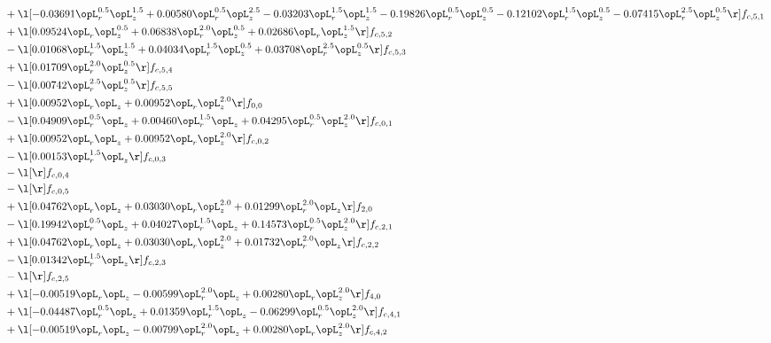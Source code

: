 \begin{alignat}{2}
& + \l[  -0.03691 \opL_r^{0.5} \opL_z^{1.5} +  0.00580 \opL_r^{0.5} \opL_z^{2.5}   -0.03203 \opL_r^{1.5} \opL_z^{1.5}   -0.19826 \opL_r^{0.5} \opL_z^{0.5}   -0.12102 \opL_r^{1.5} \opL_z^{0.5}   -0.07415 \opL_r^{2.5} \opL_z^{0.5}  \r] f_{c,5,1} \nonumber \\ 
& + \l[  0.09524 \opL_r \opL_z^{0.5} +  0.06838 \opL_r^{2.0} \opL_z^{0.5} +  0.02686 \opL_r \opL_z^{1.5}  \r] f_{c,5,2} \nonumber \\ 
& - \l[  0.01068 \opL_r^{1.5} \opL_z^{1.5} +  0.04034 \opL_r^{1.5} \opL_z^{0.5} +  0.03708 \opL_r^{2.5} \opL_z^{0.5}  \r] f_{c,5,3} \nonumber \\ 
& + \l[  0.01709 \opL_r^{2.0} \opL_z^{0.5}  \r] f_{c,5,4} \nonumber \\ 
& - \l[  0.00742 \opL_r^{2.5} \opL_z^{0.5}  \r] f_{c,5,5} \nonumber \\ 
& + \l[  0.00952 \opL_r \opL_z +  0.00952 \opL_r \opL_z^{2.0}  \r] f_{0,0} \nonumber \\ 
& - \l[  0.04909 \opL_r^{0.5} \opL_z +  0.00460 \opL_r^{1.5} \opL_z +  0.04295 \opL_r^{0.5} \opL_z^{2.0}  \r] f_{c,0,1} \nonumber \\ 
& + \l[  0.00952 \opL_r \opL_z +  0.00952 \opL_r \opL_z^{2.0}  \r] f_{c,0,2} \nonumber \\ 
& - \l[  0.00153 \opL_r^{1.5} \opL_z  \r] f_{c,0,3} \nonumber \\ 
& - \l[  \r] f_{c,0,4} \nonumber \\ 
& - \l[  \r] f_{c,0,5} \nonumber \\ 
& + \l[  0.04762 \opL_r \opL_z +  0.03030 \opL_r \opL_z^{2.0} +  0.01299 \opL_r^{2.0} \opL_z  \r] f_{2,0} \nonumber \\ 
& - \l[  0.19942 \opL_r^{0.5} \opL_z +  0.04027 \opL_r^{1.5} \opL_z +  0.14573 \opL_r^{0.5} \opL_z^{2.0}  \r] f_{c,2,1} \nonumber \\ 
& + \l[  0.04762 \opL_r \opL_z +  0.03030 \opL_r \opL_z^{2.0} +  0.01732 \opL_r^{2.0} \opL_z  \r] f_{c,2,2} \nonumber \\ 
& - \l[  0.01342 \opL_r^{1.5} \opL_z  \r] f_{c,2,3} \nonumber \\ 
& - \l[  \r] f_{c,2,5} \nonumber \\ 
& + \l[  -0.00519 \opL_r \opL_z   -0.00599 \opL_r^{2.0} \opL_z +  0.00280 \opL_r \opL_z^{2.0}  \r] f_{4,0} \nonumber \\ 
& + \l[  -0.04487 \opL_r^{0.5} \opL_z +  0.01359 \opL_r^{1.5} \opL_z   -0.06299 \opL_r^{0.5} \opL_z^{2.0}  \r] f_{c,4,1} \nonumber \\ 
& + \l[  -0.00519 \opL_r \opL_z   -0.00799 \opL_r^{2.0} \opL_z +  0.00280 \opL_r \opL_z^{2.0}  \r] f_{c,4,2} \nonumber \\ 

\end{alignat}

